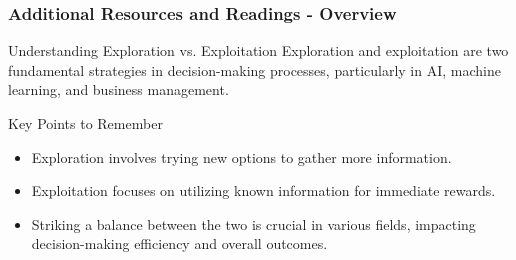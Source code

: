 \documentclass[aspectratio=169]{beamer}
\begin{document}
\begin{frame}[fragile]
    \frametitle{Additional Resources and Readings - Overview}

    \begin{block}{Understanding Exploration vs. Exploitation}
        Exploration and exploitation are two fundamental strategies in decision-making processes, particularly in AI, machine learning, and business management.
    \end{block}
    
    \begin{block}{Key Points to Remember}
        \begin{itemize}
            \item Exploration involves trying new options to gather more information.
            \item Exploitation focuses on utilizing known information for immediate rewards.
            \item Striking a balance between the two is crucial in various fields, impacting decision-making efficiency and overall outcomes.
        \end{itemize}
    \end{block}
\end{frame}
\end{document}
